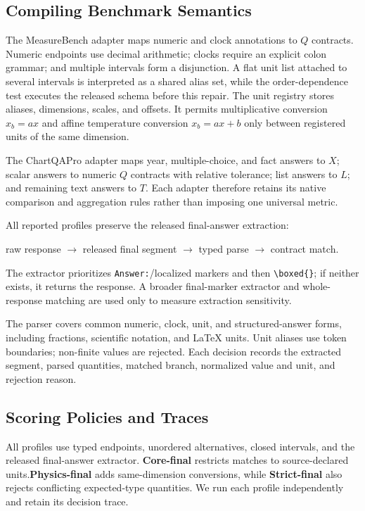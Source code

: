 \documentclass[a4paper]{llncs}
\begin{document}
\subsection{Compiling Benchmark Semantics}
The MeasureBench adapter maps numeric and clock annotations to $Q$ contracts. Numeric endpoints use decimal arithmetic; clocks require an explicit colon grammar; and multiple intervals form a disjunction. A flat unit list attached to several intervals is interpreted as a shared alias set, while the order-dependence test executes the released schema before this repair. The unit registry stores aliases, dimensions, scales, and offsets. It permits multiplicative conversion $x_b=ax$ and affine temperature conversion $x_b=ax+b$ only between registered units of the same dimension.

The ChartQAPro adapter maps year, multiple-choice, and fact answers to $X$; scalar answers to numeric $Q$ contracts with relative tolerance; list answers to $L$; and remaining text answers to $T$. Each adapter therefore retains its native comparison and aggregation rules rather than imposing one universal metric.

All reported profiles preserve the released final-answer extraction:
\begin{center}
\small raw response $\rightarrow$ released final segment $\rightarrow$ typed parse $\rightarrow$ contract match.
\end{center}
The extractor prioritizes \texttt{Answer:}/localized markers and then \verb|\boxed{}|; if neither exists, it returns the response. A broader final-marker extractor and whole-response matching are used only to measure extraction sensitivity.

The parser covers common numeric, clock, unit, and structured-answer forms, including fractions, scientific notation, and LaTeX units. Unit aliases use token boundaries; non-finite values are rejected. Each decision records the extracted segment, parsed quantities, matched branch, normalized value and unit, and rejection reason.

\subsection{Scoring Policies and Traces}
All profiles use typed endpoints, unordered alternatives, closed intervals, and the released final-answer extractor. \textbf{Core-final} restricts matches to source-declared units.\linebreak[4] \textbf{Physics-final} adds same-dimension conversions, while \textbf{Strict-final} also rejects conflicting ex\-pected-type quantities. We run each profile independently and retain its decision trace.
\end{document}
